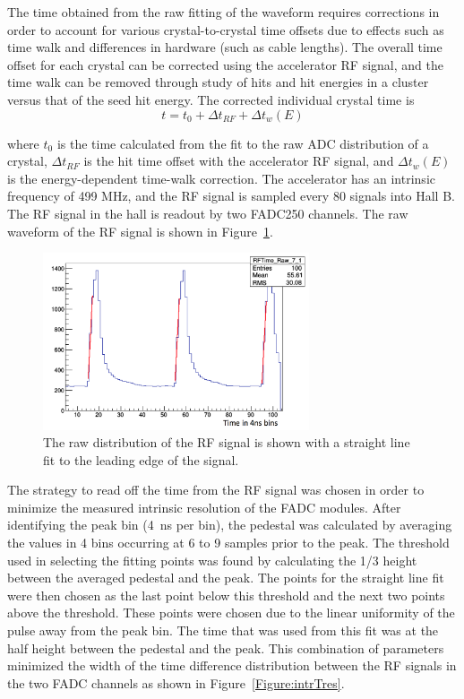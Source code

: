 The time obtained from the raw fitting of the waveform requires corrections in order to account for various crystal-to-crystal time offsets due to effects such as time walk and differences in hardware (such as cable lengths). The overall time offset for each crystal can be corrected using the accelerator RF signal, and the time walk can be removed through study of hits and hit energies in a cluster versus that of the seed hit energy. The corrected individual crystal time is \\

\begin{equation}
	\label{eq:toff}
	t = t_0 +\Delta t_{RF} + \Delta t_w (E)
\end{equation}

where $t_0$ is the time calculated from the fit to the raw ADC distribution of a crystal, $\Delta t_{RF}$ is the hit time offset with the accelerator RF signal, and $\Delta t_w(E)$ is the energy-dependent time-walk correction. The accelerator has an intrinsic frequency of 499 MHz, and the RF signal is sampled every 80 signals into Hall B. The RF signal in the hall is readout by two FADC250 channels. The raw waveform of the RF signal is shown in Figure~\ref{Figure:rfFits}. 

\begin{figure}[htb]
  \centering
      \includegraphics[width=0.7\textwidth]{pics/performance/rfFits.png}
  \caption[Fitted, raw waveform of the RF signal in HPS]{The raw distribution of the RF signal is shown with a straight line fit to the leading edge of the signal.}
  \label{Figure:rfFits}
\end{figure}

The strategy to read off the time from the RF signal was chosen in order to minimize the measured intrinsic resolution of the FADC modules. After identifying the peak bin (4~ns per bin), the pedestal was calculated by averaging the values in 4 bins occurring at 6 to 9 samples prior to the peak. The threshold used in selecting the fitting points was found by calculating the 1/3 height between the averaged pedestal and the peak. The points for the straight line fit were then chosen as the last point below this threshold and the next two points above the threshold. These points were chosen due to the linear uniformity of the pulse away from the
peak bin. The time that was used from this fit was at the half height between the pedestal and the peak. This combination of parameters minimized the width of the time difference distribution between the RF signals in the two FADC channels as shown in Figure~\ref{Figure:intrTres}. 

